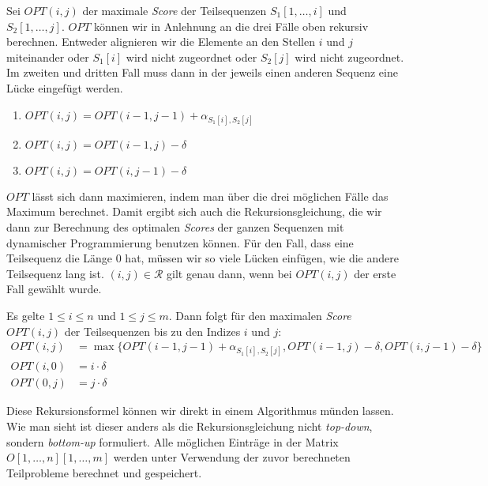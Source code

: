 Sei $OPT(i,j)$ der maximale \emph{Score} der Teilsequenzen $S_1[1,\dots,i]$ und $S_2[1,\dots,j]$. $OPT$ können wir in Anlehnung an die drei Fälle oben rekursiv berechnen. Entweder alignieren wir die Elemente an den Stellen $i$ und $j$ miteinander oder $S_1[i]$ wird nicht zugeordnet oder $S_2[j]$ wird nicht zugeordnet. Im zweiten und dritten Fall muss dann in der jeweils einen anderen Sequenz eine Lücke eingefügt werden.

\begin{enumerate}[topsep=0pt,itemsep=-1ex,partopsep=1ex,parsep=1ex]
	\item $OPT(i,j) = OPT(i-1,j-1) + \alpha_{S_1[i],S_2[j]}$
	\item $OPT(i,j) = OPT(i-1,j) - \delta$
	\item $OPT(i,j) = OPT(i,j-1) - \delta$
\end{enumerate}

$OPT$ lässt sich dann maximieren, indem man über die drei möglichen Fälle das Maximum berechnet. Damit ergibt sich auch die Rekursionsgleichung, die wir dann zur Berechnung des optimalen \emph{Scores} der ganzen Sequenzen mit dynamischer Programmierung benutzen können. Für den Fall, dass eine Teilsequenz die Länge 0 hat, müssen wir so viele Lücken einfügen, wie die andere Teilsequenz lang ist. $(i,j) \in \mathcal{R}$ gilt genau dann, wenn bei $OPT(i,j)$ der erste Fall gewählt wurde.

\begin{korollar}
	Es gelte $1 \leq i \leq n$ und $1 \leq j \leq m$. Dann folgt für den maximalen \emph{Score} $OPT(i,j)$ der Teilsequenzen bis zu den Indizes $i$ und $j$:
	\begin{equation}
	\begin{split}
		OPT(i,j) & = \max\{OPT(i-1,j-1) + \alpha_{S_1[i],S_2[j]}, OPT(i-1,j) - \delta, OPT(i,j-1) - \delta\} \\
		OPT(i,0) & = i\cdot \delta \\
		OPT(0,j) & = j\cdot \delta 
	\end{split}
	\end{equation}
\end{korollar}

Diese Rekursionsformel können wir direkt in einem Algorithmus münden lassen. Wie man sieht ist dieser anders als die Rekursionsgleichung nicht \emph{top-down}, sondern \emph{bottom-up} formuliert. Alle möglichen Einträge in der Matrix $O[1,\dots,n][1,\dots,m]$ werden unter Verwendung der zuvor berechneten Teilprobleme berechnet und gespeichert. 

